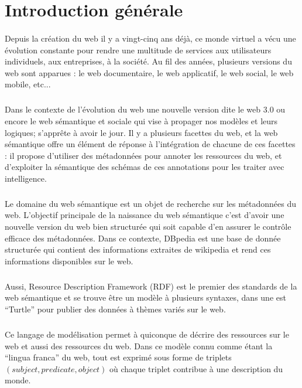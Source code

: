 \section*{Introduction générale}
\paragraph{}
Depuis la création du web il y a vingt-cinq ans déjà, ce monde virtuel a vécu une évolution constante pour rendre une multitude de services aux utilisateurs individuels, aux entreprises, à la société. Au fil des années, plusieurs versions du web sont apparues : le web documentaire, le web applicatif, le web social, le web mobile, etc...
\subparagraph{}
Dans le contexte de l’évolution du web une nouvelle version dite le web 3.0 ou encore le web sémantique et sociale qui vise à propager nos modèles et leurs logiques; s’apprête à avoir le jour. Il y a plusieurs facettes du web, et la web sémantique offre un élément de réponse à l’intégration de chacune de ces facettes : il propose d’utiliser des métadonnées pour annoter les ressources du web, et d’exploiter la sémantique des schémas de ces annotations pour les traiter avec intelligence.
\subparagraph{}
Le domaine du web sémantique est un objet de recherche sur les métadonnées du web. L'objectif principale de la naissance du web sémantique c'est d’avoir une nouvelle version du web bien structurée qui soit capable d’en assurer le contrôle efficace des métadonnées. Dans ce contexte, DBpedia est une base de donnée structurée qui contient des informations extraites de wikipedia et rend ces informations disponibles sur le web.
\subparagraph{}
Aussi, Resource Description Framework (RDF) est le premier des standards de la web sémantique et se trouve être un modèle à plusieurs syntaxes, dans une est  “Turtle” pour publier des données à thèmes variés sur le web.
\subparagraph{}
Ce langage de modélisation permet à quiconque de décrire des ressources sur le web et aussi des ressources du web. Dans ce modèle connu comme étant la “lingua franca” du web, tout est exprimé sous forme de triplets $(subject, predicate, object)$ où chaque triplet contribue à une description du monde.
